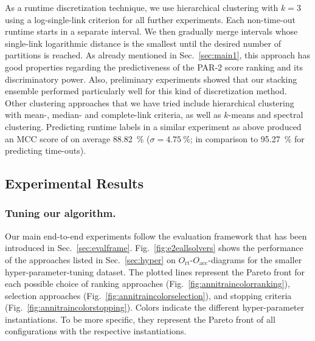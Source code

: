\documentclass[runningheads]{llncs}
\begin{document}
As a runtime discretization technique, we use hierarchical clustering with $k = 3$ using a log-single-link criterion for all further experiments.
Each non-time-out runtime starts in a separate interval.
We then gradually merge intervals whose single-link logarithmic distance is the smallest until the desired number of partitions is reached.
As already mentioned in Sec.~\ref{sec:main1}, this approach has good properties regarding the predictiveness of the PAR-2 score ranking and its discriminatory power.
Also, preliminary experiments showed that our stacking ensemble performed particularly well for this kind of discretization method.
Other clustering approaches that we have tried include hierarchical clustering with mean-, median- and complete-link criteria, as well as $k$-means and spectral clustering.
Predicting runtime labels in a similar experiment as above produced an MCC score of on average \SI{88.82}{\%} ($\sigma = \SI{4.75}{\%}$; in comparison to \SI{95.27}{\%} for predicting time-outs).

\subsection{Experimental Results}
\subsubsection{Tuning our algorithm.}
Our main end-to-end experiments follow the evaluation framework that has been introduced in Sec.~\ref{sec:evalframe}.
Fig.~\ref{fig:e2eallsolvers} shows the performance of the approaches listed in Sec.~\ref{sec:hyper} on $O_{\operatorname{rt}}$-$O_{\operatorname{acc}}$-diagrams for the smaller hyper-parameter-tuning dataset.
The plotted lines represent the Pareto front for each possible choice of ranking approaches (Fig.~\ref{fig:annitraincolorranking}), selection approaches (Fig.~\ref{fig:annitraincolorselection}), and stopping criteria (Fig.~\ref{fig:annitraincolorstopping}).
Colors indicate the different hyper-parameter instantiations.
To be more specific, they represent the Pareto front of all configurations with the respective instantiations.
\end{document}
